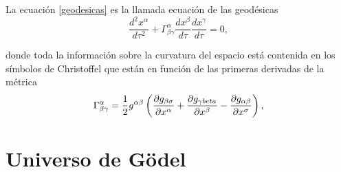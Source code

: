 \documentclass[11pt]{book}
\begin{document}
La ecuación \ref{geodesicas} es la llamada ecuación de las geodésicas 
\begin{equation}
\frac{d^2x^\alpha}{d\tau^2}+\Gamma^\alpha_{\beta \gamma} \frac{dx^\beta}{d\tau}\frac{dx^\gamma}{d\tau}=0,
\label{geodesicas}
\end{equation}

donde toda la información sobre la curvatura del espacio está contenida en los símbolos de Christoffel que están en función de las primeras derivadas de la métrica
\begin{equation}
\Gamma^\alpha_{\beta \gamma}=\frac{1}{2}g^{\alpha \beta} \left( \frac{\partial g_{\beta \sigma}}{\partial x^\alpha} + \frac{\partial g_{\gamma \\beta}}{\partial x^\beta} - \frac{\partial g_{\alpha \beta}}{\partial x^\sigma} \right),
\label{christoffel}
\end{equation}



\chapter{Universo de Gödel}
\end{document}
